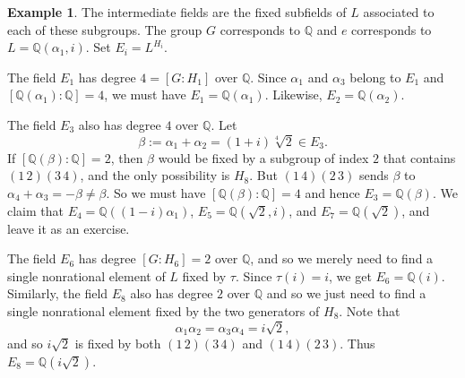 \documentclass[12pt]{report}
\numberwithin{equation}{section}
\numberwithin{theorem}{chapter}
\theoremstyle{definition}
\newtheorem{example}[theorem]{Example}
\newtheorem*{basic properties}{Basic Properties}
\newtheorem*{Important Remark}{Important Remark}
\begin{document}
\begin{example}

The intermediate fields are the fixed subfields of $L$ associated to each of these subgroups. The group $G$ corresponds to $\mathbb{Q}$ and $e$ corresponds to $L = \mathbb{Q}(\alpha_1, i)$. Set $E_i = L^{H_i}$.

The field $E_1$ has degree $4 = [G:H_1]$ over $\mathbb{Q}$. Since $\alpha_1$ and $\alpha_3$ belong to $E_1$ and $[\mathbb{Q}(\alpha_1):\mathbb{Q}]=4$, we must have $E_1 = \mathbb{Q}(\alpha_1)$. Likewise, $E_2 = \mathbb{Q}(\alpha_2)$.

The field $E_3$ also has degree $4$ over $\mathbb{Q}$. Let 
$$\beta := \alpha_1 + \alpha_2 = (1+i)\sqrt[4]{2} \in E_3.$$ 
If $[\mathbb{Q}(\beta):\mathbb{Q}] = 2$, then $\beta$ would be fixed by a subgroup of index $2$ that contains $(1 \, 2)(3 \, 4)$, and the only possibility is $H_8$. But $(1 \, 4)(2 \, 3)$ sends $\beta$ to $\alpha_4 + \alpha_3 = - \beta \neq \beta$. So we must have $[\mathbb{Q}(\beta):\mathbb{Q}] = 4$ and hence $E_3 = \mathbb{Q}(\beta)$.
We claim that $E_4 = \mathbb{Q}((1-i) \alpha_1)$, $E_5 = \mathbb{Q}(\sqrt{2},i)$, and $E_7 = \mathbb{Q}(\sqrt{2})$, and leave it as an exercise.


The field $E_6$ has degree $[G:H_6] = 2$ over $\mathbb{Q}$, and so we merely need to find a single nonrational element of $L$ fixed by $\tau$. Since $\tau(i) = i$, we get $E_6 = \mathbb{Q}(i)$.
Similarly, the field $E_8$ also has degree $2$ over $\mathbb{Q}$ and so we just need to find a single nonrational element fixed by the two generators of $H_8$.
Note that
$$\alpha_1 \alpha_2 = \alpha_3 \alpha_4 = i \sqrt{2},$$ 
and so $i \sqrt{2}$ is fixed by both $(1 \, 2)(3 \, 4)$ and  $(1 \,4)(2 \, 3)$. Thus $E_8 =\mathbb{Q}(i \sqrt{2})$.


\end{example}
\end{document}
